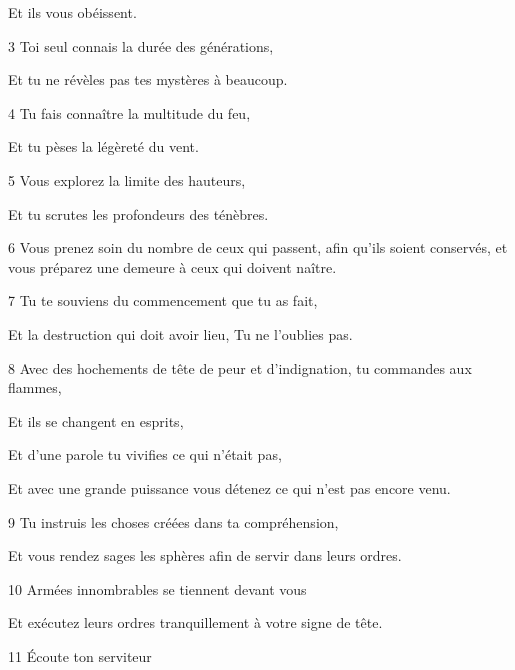 \par Et ils vous obéissent.

\par 3 Toi seul connais la durée des générations,

\par Et tu ne révèles pas tes mystères à beaucoup.

\par 4 Tu fais connaître la multitude du feu,

\par Et tu pèses la légèreté du vent.

\par 5 Vous explorez la limite des hauteurs,

\par Et tu scrutes les profondeurs des ténèbres.

\par 6 Vous prenez soin du nombre de ceux qui passent, afin qu'ils soient conservés, et vous préparez une demeure à ceux qui doivent naître.

\par 7 Tu te souviens du commencement que tu as fait,

\par Et la destruction qui doit avoir lieu, Tu ne l'oublies pas.

\par 8 Avec des hochements de tête de peur et d'indignation, tu commandes aux flammes,

\par Et ils se changent en esprits,

\par Et d'une parole tu vivifies ce qui n'était pas,

\par Et avec une grande puissance vous détenez ce qui n'est pas encore venu.

\par 9 Tu instruis les choses créées dans ta compréhension,

\par Et vous rendez sages les sphères afin de servir dans leurs ordres.

\par 10 Armées innombrables se tiennent devant vous

\par Et exécutez leurs ordres tranquillement à votre signe de tête.

\par 11 Écoute ton serviteur

